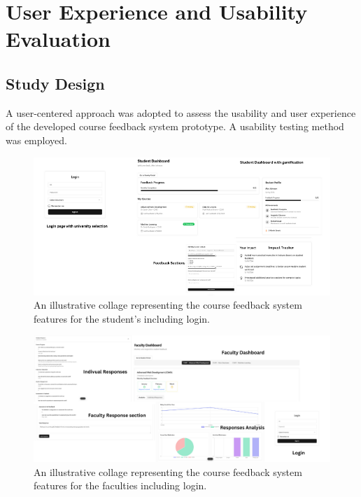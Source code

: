 \documentclass[conference]{IEEEtran}
\begin{document}
\section{User Experience and Usability Evaluation}
\subsection{Study Design}

A user-centered approach was adopted to assess the usability and user experience of the developed course feedback system prototype. A usability testing method was employed.
\begin{figure}[!h]
    \centering
    \includegraphics[width=\linewidth]{features.png}
    \caption{An illustrative collage representing the course feedback system features for the student's including login.}
    \label{fig:student_features}
    \end{figure}

    \begin{figure}[!h]
        \centering
        \includegraphics[width=\linewidth]{faculty.png}
        \caption{An illustrative collage representing the course feedback system features for the faculties including login.}
        \label{fig:faculty_features}
        \end{figure}
    
\end{document}
